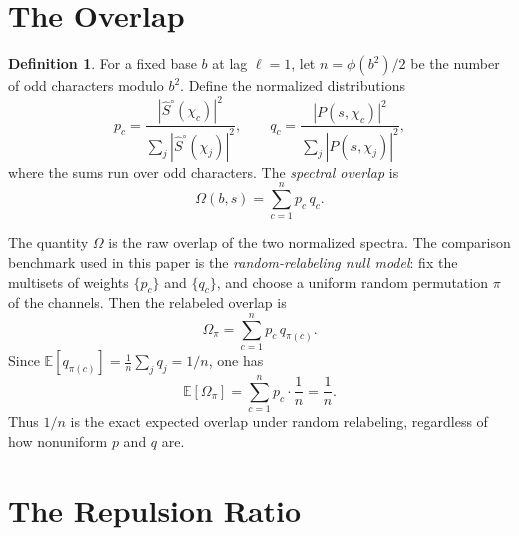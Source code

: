 \documentclass[12pt]{amsart}
\theoremstyle{definition}
\newtheorem{definition}[theorem]{Definition}
\theoremstyle{remark}
\begin{document}
\section{The Overlap}

\begin{definition}
For a fixed base $b$ at lag $\ell = 1$, let
$n = \phi(b^2)/2$ be the number of odd characters
modulo $b^2$. Define the normalized distributions
\[
p_c = \frac{|\hat{S}^{\circ}(\chi_c)|^2}
{\sum_j |\hat{S}^{\circ}(\chi_j)|^2},
\qquad
q_c = \frac{|P(s, \chi_c)|^2}
{\sum_j |P(s, \chi_j)|^2},
\]
where the sums run over odd characters. The
\emph{spectral overlap} is
\[
\Omega(b, s) = \sum_{c=1}^{n} p_c\, q_c.
\]
\end{definition}

The quantity $\Omega$ is the raw overlap of the two
normalized spectra. The comparison benchmark used in
this paper is the \emph{random-relabeling null model}:
fix the multisets of weights $\{p_c\}$ and $\{q_c\}$,
and choose a uniform random permutation $\pi$ of the
channels. Then the relabeled overlap is
\[
\Omega_\pi=\sum_{c=1}^{n} p_c\, q_{\pi(c)}.
\]
Since $\mathbb{E}[q_{\pi(c)}]=\frac1n\sum_j q_j=1/n$,
one has
\[
\mathbb{E}[\Omega_\pi]=\sum_{c=1}^{n} p_c\cdot\frac1n
=\frac1n.
\]
Thus $1/n$ is the exact expected overlap under random
relabeling, regardless of how nonuniform $p$ and $q$
are.

\section{The Repulsion Ratio}
\end{document}
